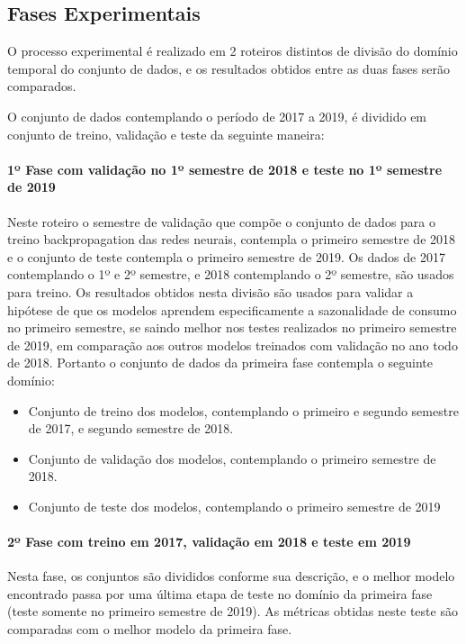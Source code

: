     	\subsection{Fases Experimentais}
            O processo experimental é realizado em 2 roteiros distintos de divisão do domínio temporal do conjunto de dados, e os resultados obtidos entre as duas fases serão comparados.
            
            O conjunto de dados contemplando o período de 2017 a 2019, é dividido em conjunto de treino, validação e teste da seguinte maneira: 
            
            \paragraph{1º Fase com validação no 1º semestre de 2018 e teste no 1º semestre de 2019}
                Neste roteiro o semestre de validação que compõe o conjunto de dados para o treino backpropagation das redes neurais, contempla o primeiro semestre de 2018 e o conjunto de teste contempla o primeiro semestre de 2019.
                Os dados de 2017 contemplando o 1º e 2º semestre, e 2018 contemplando o 2º semestre, são usados para treino. Os resultados obtidos nesta divisão são usados para validar a hipótese de que os modelos aprendem especificamente a sazonalidade de consumo no primeiro semestre, se saindo melhor nos testes realizados no primeiro semestre de 2019, em comparação aos outros modelos treinados com validação no ano todo de 2018.
                Portanto o conjunto de dados da primeira fase contempla o seguinte domínio:
            \begin{itemize}
                    \item Conjunto de treino dos modelos, contemplando o primeiro e segundo semestre de 2017, e segundo semestre de 2018.
                    \item Conjunto de validação dos modelos, contemplando o primeiro semestre de 2018.
                    \item Conjunto de teste dos modelos, contemplando o primeiro semestre de 2019             
            \end{itemize}
            
            \paragraph{2º Fase com treino em 2017, validação em 2018 e teste em 2019}
                Nesta fase, os conjuntos são divididos conforme sua descrição, e o melhor modelo encontrado passa por uma última etapa de teste no domínio da primeira fase (teste somente no primeiro semestre de 2019).
                As métricas obtidas neste teste são comparadas com o melhor modelo da primeira fase.
    
